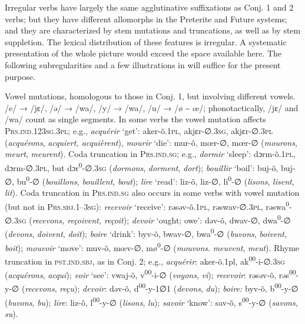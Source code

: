 \documentclass[output=paper, colorlinks,citecolor=brown]{langsci/langscibook}
\begin{document}
Irregular verbs have largely the same agglutinative suffixations as Conj. 1 and 2 verbs; but they have different allomorphs in the Preterite and Future systems; and they are characterized by stem mutations and truncations, as well as by stem suppletion. The lexical distribution of these features is irregular. A systematic presentation of the whole picture would exceed the space available here. The following subregularities and a few illustrations in  will suffice for the present purpose.

\ea \label{ex:andersen_4}
\ea \label{ex:andersen_4a}
Vowel mutations, homologous to those in Conj. 1, but involving different vowels. /e/ → /jɛ/, /ǝ/ → /wa/, /y/ → /wa/, /u/ → /ø {\textasciitilde} œ/; phonotactically, /jɛ/ and /wa/ count as single segments. In some verbs the vowel mutation affects \textsc{Prs.ind.123sg.3pl}; e.g., \textit{acquérir} ‘get': aker-õ.\textsc{1pl}, akjɛr-∅.\textsc{3sg}, akjɛr-∅.\textsc{3pl} (\textit{acquérons}, \textit{acquiert, acquièrent}), \textit{mourir} ‘die': mur-õ, mœr-∅, mœr-∅ (\textit{mourons}, \textit{meurt}, \textit{meurent}).
\ex \label{ex:andersen_4b}
      Coda truncation in \textsc{Prs.ind.sg}; e.g., \textit{dormir} ‘sleep': dɔrm-õ.\textsc{1pl}, dɔrm-∅.\textsc{3pl}, but dɔr\textsuperscript{0}{}-∅.\textsc{3sg} (\textit{dormons}, \textit{dorment}, \textit{dort}); \textit{bouillir} ‘boil': buj-õ, buj-∅, bu\textsuperscript{0}{}-∅ (\textit{bouillons}, \textit{bouillent}, \textit{bout}); \textit{lire} ‘read': liz-õ, liz-∅, li\textsuperscript{0}{}-∅ (\textit{lisons}, \textit{lisent}, \textit{lit}).
\ex \label{ex:andersen_4c}
      Coda truncation in \textsc{Prs.ind.sg} also occurs in some verbs with vowel mutation (but not in \textsc{Prs.sbj.1–3sg}): \textit{recevoir} ‘receive': rǝsǝv-õ.\textsc{1pl}, rǝswav-∅.\textsc{3pl}, rǝswa\textsuperscript{0}{}-∅.\textsc{3sg} (\textit{recevons, reçoivent, reçoit}); \textit{devoir} ‘ought; owe': dǝv-õ, dwav-∅, dwa\textsuperscript{0}{}-∅ (\textit{devons}, \textit{doivent}, \textit{doit}); \textit{boire} ‘drink': byv-õ, bwav-∅, bwa\textsuperscript{0}{}-∅ (\textit{buvons}, \textit{boivent}, \textit{boit}); \textit{mouvoir} ‘move': muv-õ, mœv-∅, mø\textsuperscript{0}{}-∅ (\textit{mouvons}. \textit{meuvent}, \textit{meut}).
\ex \label{ex:andersen_4d}
      Rhyme truncation in \textsc{pst.ind.sbj}, as in Conj. 2; e.g., \textit{acquérir}: aker-õ.1pl, ak\textsuperscript{00}{}-i-∅.\textsc{3sg} (\textit{acquérons}, \textit{acqui}); \textit{voir} ‘see': vwaj-õ, v\textsuperscript{00}{}-i-∅ (\textit{voyons}, \textit{vi}); \textit{recevoir}: rǝsǝv-õ, rǝs\textsuperscript{00}{}-y-∅ (\textit{recevons}, \textit{reçu}); \textit{devoir}: dǝv-õ, d\textsuperscript{00}{}-y-1∅1 (\textit{devons}, \textit{du}); \textit{boire:} byv-õ, b\textsuperscript{00}{}-y-∅ (\textit{buvons}, \textit{bu}); \textit{lire}: liz-õ, l\textsuperscript{00}{}-y-∅ (\textit{lisons}, \textit{lu}); \textit{savoir} ‘know': sav-õ, s\textsuperscript{00}{}-y-∅ (\textit{savons, su}).
\end{document}
